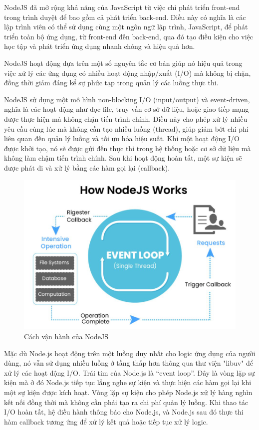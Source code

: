 NodeJS đã mở rộng khả năng của JavaScript từ việc chỉ phát triển front-end trong trình duyệt để bao gồm cả phát triển back-end. Điều này có nghĩa là các lập trình viên có thể sử dụng cùng một ngôn ngữ lập trình, JavaScript, để phát triển toàn bộ ứng dụng, từ front-end đến back-end, qua đó tạo điều kiện cho việc học tập và phát triển ứng dụng nhanh chóng và hiệu quả hơn.

NodeJS hoạt động dựa trên một số nguyên tắc cơ bản giúp nó hiệu quả trong việc xử lý các ứng dụng có nhiều hoạt động nhập/xuất (I/O) mà không bị chặn, đồng thời giảm đáng kể sự phức tạp trong quản lý các luồng thực thi.

NodeJS sử dụng một mô hình non-blocking I/O (input/output) và event-driven, nghĩa là các hoạt động như đọc file, truy vấn cơ sở dữ liệu, hoặc giao tiếp mạng được thực hiện mà không chặn tiến trình chính. Điều này cho phép xử lý nhiều yêu cầu cùng lúc mà không cần tạo nhiều luồng (thread), giúp giảm bớt chi phí liên quan đến quản lý luồng và tối ưu hóa hiệu suất. Khi một hoạt động I/O được khởi tạo, nó sẽ được gửi đến thực thi trong hệ thống hoặc cơ sở dữ liệu mà không làm chậm tiến trình chính. Sau khi hoạt động hoàn tất, một sự kiện sẽ được phát đi và xử lý bằng các hàm gọi lại (callback).

\begin{figure}[H]
    \centering
    \includegraphics[scale=0.5]{img/NodeJS-work.png}
    \caption{Cách vận hành của NodeJS}
    \label{fig:nodejs}
\end{figure}

Mặc dù Node.js hoạt động trên một luồng duy nhất cho logic ứng dụng của người dùng, nó vẫn sử dụng nhiều luồng ở tầng thấp hơn thông qua thư viện "libuv" để xử lý các hoạt động I/O. Trái tim của Node.js là “event loop”. Đây là vòng lặp sự kiện mà ở đó Node.js tiếp tục lắng nghe sự kiện và thực hiện các hàm gọi lại khi một sự kiện được kích hoạt. Vòng lặp sự kiện cho phép Node.js xử lý hàng nghìn kết nối đồng thời mà không cần phải tạo ra chi phí quản lý luồng. Khi thao tác I/O hoàn tất, hệ điều hành thông báo cho Node.js, và Node.js sau đó thực thi hàm callback tương ứng để xử lý kết quả hoặc tiếp tục xử lý logic.

